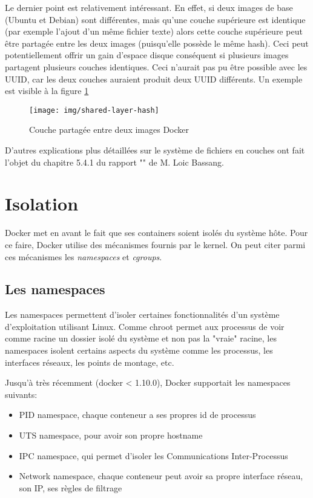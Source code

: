 Le dernier point est relativement intéressant. En effet, si deux images de base (Ubuntu et Debian) sont différentes, mais qu'une couche supérieure est identique (par exemple l'ajout d'un même fichier texte) alors cette couche supérieure peut être partagée entre les deux images (puisqu'elle possède le même hash). Ceci peut potentiellement offrir un gain d'espace disque conséquent si plusieurs images partagent plusieurs couches identiques. Ceci n'aurait pas pu être possible avec les UUID, car les deux couches auraient produit deux UUID différents. Un exemple est visible à la figure \ref{shared-layer-hash}

\begin{figure}[hbtp]
\centering
\texttt{[image: img/shared-layer-hash]}
\caption{Couche partagée entre deux images Docker}
\label{shared-layer-hash}
\end{figure}

D'autres explications plus détaillées sur le système de fichiers en couches ont fait l'objet du chapitre 5.4.1 du rapport "\bassangPrjSemestre" de M. Loic Bassang.


\section{Isolation}\label{pres-docker-isolation}
Docker met en avant le fait que ses containers soient isolés du système hôte. Pour ce faire, Docker utilise des mécanismes fournis par le kernel. On peut citer parmi ces mécanismes les \textit{namespaces} et \textit{cgroups}.

\subsection{Les namespaces}\label{sc-namespaces}
Les namespaces permettent d'isoler certaines fonctionnalités d'un système d'exploitation utilisant Linux. Comme chroot permet aux processus de voir comme racine un dossier isolé du système et non pas la "vraie" racine, les namespaces isolent certains aspects du système comme les processus, les interfaces réseaux, les points de montage, etc.

Jusqu'à très récemment (docker < 1.10.0), Docker supportait les namespaces suivants\cite{docker_1_10_user_namespace}:

\begin{itemize}
\item PID namespace, chaque conteneur a ses propres id de processus
\item UTS namespace, pour avoir son propre hostname
\item IPC namespace, qui permet d'isoler les Communications Inter-Processus
\item Network namespace, chaque conteneur peut avoir sa propre interface réseau, son IP, ses règles de filtrage
\end{itemize}

